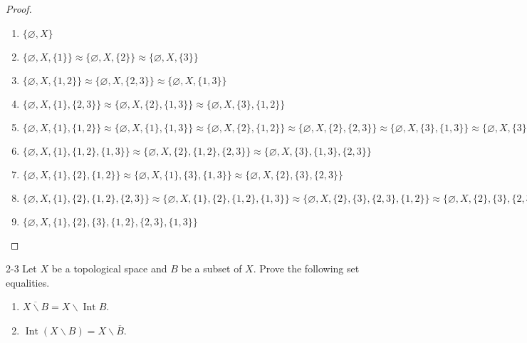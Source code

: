 \begin{proof}
	\begin{enumerate}[label={\arabic*.}]
		\item $\{ \varnothing, X \}$
		\item $\{ \varnothing, X, \{ 1 \} \} \approx \{ \varnothing, X, \{ 2 \} \} \approx \{ \varnothing, X, \{ 3 \} \}$
		\item $\{ \varnothing, X, \{ 1, 2 \} \} \approx \{ \varnothing, X, \{ 2, 3 \} \} \approx \{ \varnothing, X, \{ 1, 3 \} \}$
		\item $\{ \varnothing, X, \{ 1 \}, \{ 2, 3 \} \} \approx \{ \varnothing, X, \{ 2 \}, \{ 1, 3 \} \} \approx \{ \varnothing, X, \{ 3 \}, \{ 1, 2 \} \}$
		\item $\{ \varnothing, X, \{ 1 \}, \{ 1, 2 \} \} \approx \{ \varnothing, X, \{ 1 \}, \{ 1, 3 \} \} \approx \{ \varnothing, X, \{ 2 \}, \{ 1, 2 \} \} \approx \{ \varnothing, X, \{ 2 \}, \{ 2, 3 \} \} \approx \{ \varnothing, X, \{ 3 \}, \{ 1, 3 \} \} \approx \{ \varnothing, X, \{ 3 \}, \{ 2, 3 \} \}$
		\item $\{ \varnothing, X, \{ 1 \}, \{ 1, 2 \}, \{ 1, 3 \} \} \approx \{ \varnothing, X, \{ 2 \}, \{ 1, 2 \}, \{ 2, 3 \} \} \approx \{ \varnothing, X, \{ 3 \}, \{ 1, 3 \}, \{ 2, 3 \} \}$
		\item $\{ \varnothing, X, \{ 1 \}, \{ 2 \}, \{ 1, 2 \} \} \approx \{ \varnothing, X, \{ 1 \}, \{ 3 \}, \{ 1, 3 \} \} \approx \{ \varnothing, X, \{ 2 \}, \{ 3 \}, \{ 2, 3 \} \}$
		\item $\{ \varnothing, X, \{ 1 \}, \{ 2 \}, \{ 1, 2 \}, \{ 2, 3 \} \} \approx \{ \varnothing, X, \{ 1 \}, \{ 2 \}, \{ 1, 2 \}, \{ 1, 3 \} \} \approx \{ \varnothing, X, \{ 2 \}, \{ 3 \}, \{ 2, 3 \}, \{ 1, 2 \} \} \approx \{ \varnothing, X, \{ 2 \}, \{ 3 \}, \{ 2, 3 \}, \{ 1, 3 \} \} \approx \{ \varnothing, X, \{ 1 \}, \{ 3 \}, \{ 1, 3 \}, \{ 2, 3 \} \} \approx \{ \varnothing, X, \{ 1 \}, \{ 3 \}, \{ 1, 2 \}, \{ 1, 3 \} \}$
		\item $\{ \varnothing, X, \{ 1 \}, \{ 2 \}, \{ 3 \}, \{ 1, 2 \}, \{ 2, 3 \}, \{ 1, 3 \} \}$
	\end{enumerate}
\end{proof}

\begin{problem}{2-3}
Let $X$ be a topological space and $B$ be a subset of $X$. Prove the following set equalities.
\begin{enumerate}[label={(\alph*)}]
	\item $\overline{X\smallsetminus B} = X\smallsetminus\operatorname{Int} B$.
	\item $\operatorname{Int}(X\smallsetminus B) = X\smallsetminus \overline{B}$.
\end{enumerate}
\end{problem}

